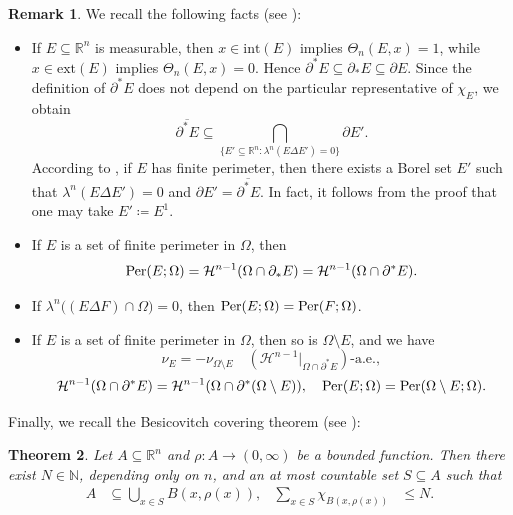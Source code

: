 \documentclass[pdflatex,sn-mathphys-num]{sn-jnl}
\theoremstyle{plain}
\newtheorem{theorem}{Theorem}[section]
\theoremstyle{definition}
\newtheorem{rem}[theorem]{Remark}
\DeclareMathOperator{\Per}{\textup{Per}}
\begin{document}
\begin{rem}\label{remarko}
We recall the following facts (see \cite[Section 3.3]{ambrosio}):
\begin{itemize}
\item If $E \subseteq \mathbb{R}^n$ is measurable, then $x \in \mathrm{int}(E)$ implies $\Theta_n(E, x) = 1$, while $x \in \mathrm{ext}(E)$ implies $\Theta_n(E, x) = 0$.  
Hence $\partial^* E \subseteq \partial_* E \subseteq \partial E$.  
Since the definition of $\partial^* E$ does not depend on the particular representative of $\chi_E$, we obtain
\[
\overline{\partial^* E} \subseteq \bigcap_{\{E' \subseteq \mathbb{R}^n : \lambda^n(E \Delta E') = 0\}} \partial E'.
\]
According to \cite[Proposition 12.19 and Remark 15.3]{ASE}, if $E$ has finite perimeter, then there exists a Borel set $E'$ such that $\lambda^n(E \Delta E') = 0$ and $\partial E' = \overline{\partial^* E}$.  
In fact, it follows from the proof that one may take $E' \coloneq E^1$.

\item If $E$ is a set of finite perimeter in $\Omega$, then
\[
\Per(E; \Omega) = \mathcal{H}^{n-1}(\Omega \cap \partial_* E)
= \mathcal{H}^{n-1}(\Omega \cap \partial^* E).
\]

\item If $\lambda^n\big((E \Delta F) \cap \Omega\big) = 0$, then $\Per(E; \Omega) = \Per(F; \Omega)$.

\item If $E$ is a set of finite perimeter in $\Omega$, then so is $\Omega \setminus E$, and we have
\[
\nu_E = -\nu_{\Omega \setminus E} 
\quad \left(\mathcal{H}^{n-1}\Big|_{\Omega \cap \partial^* E}\right)\text{-a.e.},
\]
\[
\mathcal{H}^{n-1}(\Omega \cap \partial^* E)
= \mathcal{H}^{n-1}(\Omega \cap \partial^*(\Omega \setminus E)),
\quad
\Per(E; \Omega) = \Per(\Omega \setminus E; \Omega).
\]
\end{itemize}
\end{rem}

Finally, we recall the Besicovitch covering theorem (see \cite[Subsection 1.5.2, Theorem 2]{evans}):

\begin{theorem}\label{bes}
Let $A \subseteq \mathbb{R}^n$ and $\rho \colon A \to (0, \infty)$ be a bounded function.  
Then there exist $N \in \mathbb{N}$, depending only on $n$, and an at most countable set $S \subseteq A$ such that
\begin{align*}
A &\subseteq \bigcup_{x \in S} B(x, \rho(x)), 
&
\sum_{x \in S} \chi_{B(x, \rho(x))} &\le N.
\end{align*}
\end{theorem}
\end{document}
